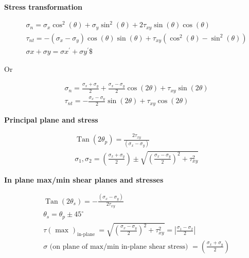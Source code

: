 \documentclass[
  letterpaper,
  DIV=11,
  numbers=noendperiod]{scrreprt}
\begin{document}
\begin{tcolorbox}[enhanced jigsaw, breakable, opacityback=0, toptitle=1mm, left=2mm, colback=white, opacitybacktitle=0.6, colframe=quarto-callout-note-color-frame, titlerule=0mm, arc=.35mm, leftrule=.75mm, bottomtitle=1mm, colbacktitle=quarto-callout-note-color!10!white, rightrule=.15mm, title={Key equations}, bottomrule=.15mm, toprule=.15mm, coltitle=black]

\textbf{Stress transformation}

\[
\begin{aligned}
& \sigma_n=\sigma_x \cos ^2(\theta)+\sigma_y \sin ^2(\theta)+2 \tau_{x y} \sin (\theta) \cos (\theta) \\
& \tau_{n t}=-\left(\sigma_x-\sigma_y\right) \cos (\theta) \sin (\theta)+\tau_{x y}\left(\cos ^2(\theta)-\sin ^2(\theta)\right) \\
& \sigma x+\sigma y=\sigma x^{\prime}+\sigma y^{\prime} \$
\end{aligned}
\]

Or

\[
\begin{aligned}
& \sigma_n=\frac{\sigma_x+\sigma_y}{2}+\frac{\sigma_x-\sigma_y}{2} \cos (2 \theta)+\tau_{x y} \sin (2 \theta) \\
& \tau_{n t}=-\frac{\sigma_x-\sigma_y}{2} \sin (2 \theta)+\tau_{x y} \cos (2 \theta)
\end{aligned}
\]

\textbf{Principal plane and stress}

\[
\begin{aligned}
& \operatorname{Tan}\left(2 \theta_p\right)=\frac{2 \tau_{x y}}{\left(\sigma_x-\sigma_y\right)} \\
& \sigma_1, \sigma_2=\left(\frac{\sigma_x+\sigma_y}{2}\right) \pm \sqrt{\left(\frac{\sigma_x-\sigma_y}{2}\right)^2+\tau_{x y}^2}
\end{aligned}
\]

\textbf{In plane max/min shear planes and stresses}

\[
\begin{aligned}
& \operatorname{Tan}\left(2 \theta_s\right)=-\frac{\left(\sigma_x-\sigma_y\right)}{2 \tau_{x y}} \\
& \theta_s=\theta_p \pm 45^{\circ} \\
& \tau(\text { max })_{\text {in-plane }}=\sqrt{\left(\frac{\sigma_x-\sigma_y}{2}\right)^2+\tau_{x y}^2}=\left|\frac{\sigma_1-\sigma_2}{2}\right| \\
& \sigma \text { (on plane of max/min in-plane shear stress) }=\left(\frac{\sigma_x+\sigma_y}{2}\right)
\end{aligned}
\]


\end{tcolorbox}
\end{document}
